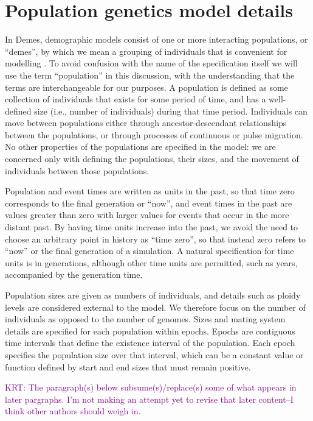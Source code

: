 \documentclass[11pt]{article}
\newcommand{\krtcomment}[1]{{\textcolor{purple}{KRT: #1}}}
\begin{document}
\section{Population genetics model details}\label{sec:appendix-pop-gen-model}

In Demes, demographic models consist of one or more interacting populations,
or ``demes'', by which we mean a grouping of individuals that is convenient
for modelling \citep{gilmour_demes_1939,gilmour_deme_1955}.
To avoid confusion with the name of the specification itself we will
use the term ``population'' in this discussion, with the understanding that the
terms are interchangeable for our purposes.
A population is defined as some collection of individuals that exists for
some period of time, and has a well-defined size (i.e., number of individuals)
during that time period. Individuals can move between populations
either through ancestor-descendant relationships between the populations,
or through processes of continuous or pulse migration.
No other properties of the populations are specified in the model:
we are concerned only with defining the populations, their sizes, and the
movement of individuals between those populations.

Population and event times are written as units in the past, so that time zero
corresponds to the final generation or ``now'', and event times in the past are
values greater than zero with larger values for events that occur in the more
distant past. By having time units increase into the past, we avoid the need to
choose an arbitrary point in history as ``time zero'', so that instead zero
refers to ``now'' or the final generation of a simulation. A natural
specification for time units is in generations, although other time units are
permitted, such as years, accompanied by the generation time.

Population sizes are given as numbers of individuals, and details
such as ploidy levels are considered external to the model.
We therefore focus on the number of individuals as opposed to the number of genomes.
Sizes and mating system details are specified for each population within
epochs.
Epochs are contiguous time intervals that define
the existence interval of the population. Each epoch specifies the population size
over that interval, which can be a constant value or function defined by start
and end sizes that must remain positive.

\krtcomment{The paragraph(s) below subsume(s)/replace(s) some of what appears in later pargraphs.
	I'm not making an attempt yet to revise that later content--I think other authors should
	weigh in.}
\end{document}
